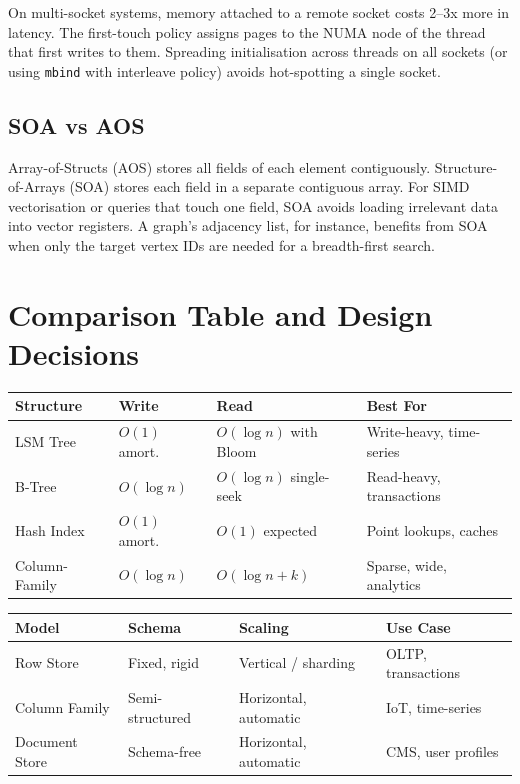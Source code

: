 On multi-socket systems, memory attached to a remote socket costs 2--3x more in
latency.  The first-touch policy assigns pages to the NUMA node of the thread that
first writes to them.  Spreading initialisation across threads on all sockets (or
using \texttt{mbind} with interleave policy) avoids hot-spotting a single socket.

\subsection{SOA vs AOS}

Array-of-Structs (AOS) stores all fields of each element contiguously.
Structure-of-Arrays (SOA) stores each field in a separate contiguous array.
For SIMD vectorisation or queries that touch one field, SOA avoids loading
irrelevant data into vector registers.  A graph's adjacency list, for instance,
benefits from SOA when only the target vertex IDs are needed for a breadth-first
search.

\section{Comparison Table and Design Decisions}

\begin{center}
\begin{tabular}{@{} l l l l @{}}
\toprule
\textbf{Structure} & \textbf{Write} & \textbf{Read} & \textbf{Best For} \\
\midrule
LSM Tree & $O(1)$ amort. & $O(\log n)$ with Bloom & Write-heavy, time-series \\
B-Tree & $O(\log n)$ & $O(\log n)$ single-seek & Read-heavy, transactions \\
Hash Index & $O(1)$ amort. & $O(1)$ expected & Point lookups, caches \\
Column-Family & $O(\log n)$ & $O(\log n + k)$ & Sparse, wide, analytics \\
\bottomrule
\end{tabular}
\end{center}

\begin{center}
\begin{tabular}{@{} l l l l @{}}
\toprule
\textbf{Model} & \textbf{Schema} & \textbf{Scaling} & \textbf{Use Case} \\
\midrule
Row Store & Fixed, rigid & Vertical / sharding & OLTP, transactions \\
Column Family & Semi-structured & Horizontal, automatic & IoT, time-series \\
Document Store & Schema-free & Horizontal, automatic & CMS, user profiles \\
\bottomrule
\end{tabular}
\end{center}

